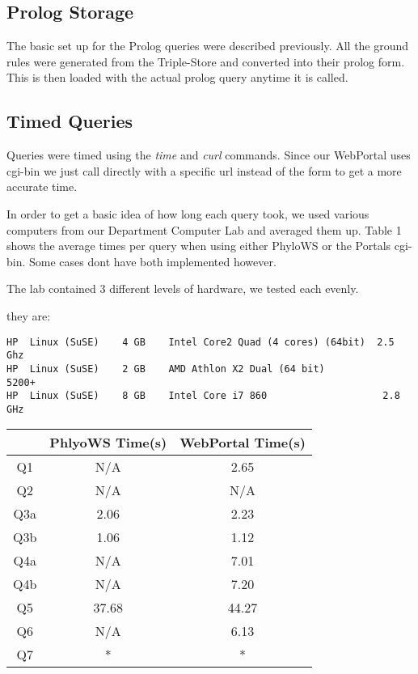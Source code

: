 \documentclass[10pt]{article}
\begin{document}
\subsection{Prolog Storage}

The basic set up for the Prolog queries were described previously.  All the
ground rules were generated from the Triple-Store and converted into their
prolog form.  This is then loaded with the actual prolog query anytime it is
called.

\subsection{Timed Queries}

Queries were timed using the \emph{time} and \emph{curl} commands.  Since our
WebPortal uses cgi-bin we just call directly with a specific url instead of the
form to get a more accurate time.

In order to get a basic idea of how long each query took, we used various
computers from our Department Computer Lab and averaged them up.  Table 1 shows
the average times per query when using either PhyloWS or the Portals cgi-bin.
Some cases dont have both implemented however.

The lab contained 3 different levels of hardware, we tested each evenly.

they are:\begin{verbatim}
HP 	Linux (SuSE) 	4 GB 	Intel Core2 Quad (4 cores) (64bit) 	2.5 Ghz
HP 	Linux (SuSE) 	2 GB 	AMD Athlon X2 Dual (64 bit) 	       5200+
HP 	Linux (SuSE) 	8 GB 	Intel Core i7 860 	                 2.8 GHz
\end{verbatim}

\begin{tabular}{|c|c|c|}
\hline
        & PhlyoWS Time(s) & WebPortal Time(s) \\ \hline
Q1   &  N/A                &   2.65   \\ \hline
Q2   & N/A                 & N/A\\ \hline
Q3a &  2.06                      & 2.23 \\ \hline
Q3b &  1.06                      & 1.12 \\ \hline
Q4a   & N/A                       &7.01 \\ \hline
Q4b & N/A                &  7.20\\ \hline
Q5   &  37.68                      & 44.27\\ \hline
Q6   & N/A                       &6.13\\ \hline
Q7   &   *                     & *\\ \hline
\end{tabular}
\\
\\
\end{document}

